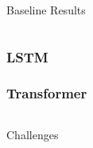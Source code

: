\documentclass[%
  aspectratio=169,
  9pt,
  USenglish,
  titlegraphic, %
  affiliationintitlepagehead,
  affiliation,
]{beamer}
\begin{document}
{
	\begin{frame}[plain]
	
	\vfill
	\Huge\color{white}
	\begin{center}
		\begin{columns}
			\vspace{7em}
			
			\hfill 
			Baseline Results
			
		\end{columns}
	\end{center}
	
	\vfill
\end{frame}
}

\begin{frame}
	\frametitle{LSTM}
\end{frame}


\begin{frame}
\frametitle{Transformer}
\end{frame}


{
	\begin{frame}[plain]
	
	\vfill
	\Huge\color{white}
	\begin{center}
		\begin{columns}
			\column{.5\textwidth}
			\vspace{7em}
			
			\hfill 
			Challenges
			\column{.5\textwidth}
			
		\end{columns}
	\end{center}
	
	\vfill
\end{frame}
}
\end{document}
